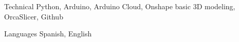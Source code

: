 
\begin{cvskills}

  \cvskill
  {Technical} %
  {Python, Arduino, Arduino Cloud, Onshape basic 3D modeling, OrcaSlicer, Github} %

  \cvskill
  {Languages} %
  {Spanish, English} %


\end{cvskills}
